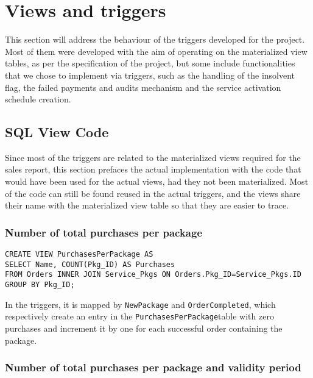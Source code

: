 
\chapter{Views and triggers}
\label{chap:views_triggers}

This section will address the behaviour of the triggers developed for the project. Most of them were developed with the aim of operating on the materialized view tables, as per the specification of the project, but some include functionalities that we chose to implement via triggers, such as the handling of the insolvent flag, the failed payments and audits mechanism and the service activation schedule creation.


\section{SQL View Code}
\label{sec:sql_views}

Since most of the triggers are related to the materialized views required for the sales report, this section prefaces the actual implementation with the code that would have been used for the actual views, had they not been materialized. Most of the code can still be found reused in the actual triggers, and the views share their name with the materialized view table so that they are easier to trace.

\subsection{Number of total purchases per package}

\begin{lstlisting}[style=SQL]
CREATE VIEW PurchasesPerPackage AS
SELECT Name, COUNT(Pkg_ID) AS Purchases
FROM Orders INNER JOIN Service_Pkgs ON Orders.Pkg_ID=Service_Pkgs.ID
GROUP BY Pkg_ID;
\end{lstlisting}

In the triggers, it is mapped by \texttt{NewPackage} and \texttt{OrderCompleted}, which respectively create an entry in the \texttt{PurchasesPerPackage}table with zero purchases and increment it by one for each successful order containing the package.

\subsection{Number of total purchases per package and validity period}

